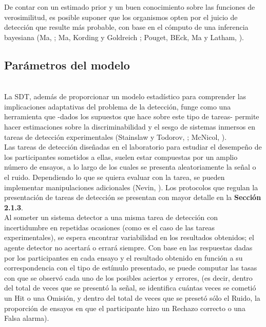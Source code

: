 De contar con un estimado prior y un buen conocimiento sobre las funciones de verosimilitud, es posible suponer que los organismos opten por el juicio de detección que resulte más probable, con base en el cómputo de una inferencia bayesiana (Ma, \citeyear{WeijiMa}; Ma, Kording y Goldreich \citeyear{WeijiMa2012}; Pouget, BEck, Ma y Latham, \citeyear{Pouget2013}).\\

\subsection{Parámetros del modelo}\\

La SDT, además de proporcionar un modelo estadístico para comprender las implicaciones adaptativas del problema de la detección, funge como una herramienta que -dados los supuestos que hace sobre este tipo de tareas- permite hacer estimaciones sobre la discriminabilidad y el sesgo de sistemas inmersos en tareas de detección experimentales (Stainslaw y Todorov, \citeyear{Stainslaw1999}; McNicol, \citeyear{McNicol1}).\\

Las tareas de detección diseñadas en el laboratorio para estudiar el desempeño de los participantes sometidos a ellas, suelen estar compuestas por un amplio número de ensayos, a lo largo de los cuales se presenta aleatoriamente la señal o el ruido. Dependiendo lo que se quiera evaluar con la tarea, se pueden implementar manipulaciones adicionales (Nevin, \citeyear{Nevin1969}). Los protocolos que regulan la presentación de tareas de detección se presentan con mayor detalle en la \textbf{Sección 2.1.3}.\\

Al someter un sistema detector a una misma tarea de detección con incertidumbre en repetidas ocasiones (como es el caso de las tareas experimentales), se espera encontrar variabilidad en los resultados obtenidos; el agente detector no acertará o errará siempre. Con base en las respuestas dadas por los participantes en cada ensayo y el resultado obtenido en función a su correspondencia con el tipo de estímulo presentado, se puede computar las tasas con que se observó cada uno de los posibles aciertos y errores, (es decir, dentro del total de veces que se presentó la señal, se identifica cuántas veces se cometió un Hit o una Omisión, y dentro del total de veces que se presetó sólo el Ruido, la proporción de ensayos en que el participante hizo un Rechazo correcto o una Falsa alarma).\\

